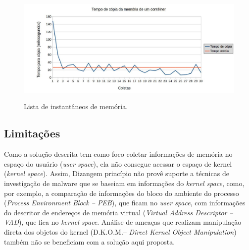 \documentclass[conference]{IEEEtran}
\newcommand{\marcosT}[1]{{\color{red}{TODO: #1}}}
\newcommand{\fancyname}{Dizang}
\begin{document}

\begin{figure}[htb!]
\caption{Lista de instantâneos de memória.}
\includegraphics[scale=0.30]{memoria_copia.jpg}
\centering
\label{fig:memoria_copia}
\end{figure}

\subsection{Limitações}

Como a solução descrita tem como foco coletar informações de memória no espaço do usuário (\textit{user space}), ela não consegue acessar o espaço de kernel (\textit{kernel space}). 
%
Assim, \fancyname em princípio não provê suporte a técnicas de investigação de malware que se baseiam em informações do \textit{kernel space}, como, por exemplo, a comparação de informações do bloco do ambiente do processo (\textit{Process Environment Block -- PEB}), que ficam no \textit{user space}, com informações do descritor de endereços de memória virtual (\textit{Virtual Address Descriptor -- VAD}), que fica no \textit{kernel space}. 
%
Análise de ameaças que realizam manipulação direta dos objetos do kernel (D.K.O.M.-- \textit{Direct Kernel Object Manipulation}) também não se beneficiam com a solução aqui proposta. 
\end{document}
